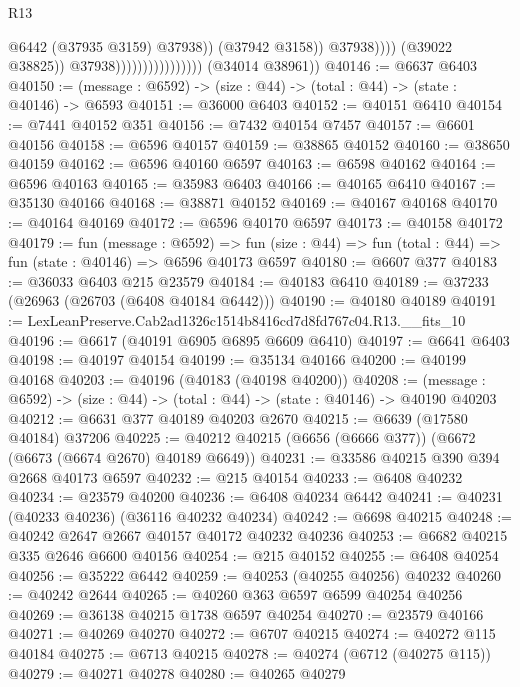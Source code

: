 \begin{lexlean}{R13}
\begin{coremodule}
                                                      @6442
                                                      (@37935 @3159)
                                                      @37938))
                                                  (@37942 @3158))
                                                @37938))))
                                        (@39022 @38825))
                                      @37938))))))))))))))))
      (@34014 @38961))
@40146 := @6637 @6403
@40150 := (message : @6592) -> (size : @44) -> (total : @44) -> (state : @40146) -> @6593
@40151 := @36000 @6403
@40152 := @40151 @6410
@40154 := @7441 @40152 @351
@40156 := @7432 @40154 @7457
@40157 := @6601 @40156
@40158 := @6596 @40157
@40159 := @38865 @40152
@40160 := @38650 @40159
@40162 := @6596 @40160 @6597
@40163 := @6598 @40162
@40164 := @6596 @40163
@40165 := @35983 @6403
@40166 := @40165 @6410
@40167 := @35130 @40166
@40168 := @38871 @40152
@40169 := @40167 @40168
@40170 := @40164 @40169
@40172 := @6596 @40170 @6597
@40173 := @40158 @40172
@40179 := fun (message : @6592) =>
  fun (size : @44) => fun (total : @44) => fun (state : @40146) => @6596 @40173 @6597
@40180 := @6607 @377
@40183 := @36033 @6403 @215 @23579
@40184 := @40183 @6410
@40189 := @37233 (@26963 (@26703 (@6408 @40184 @6442)))
@40190 := @40180 @40189
@40191 := LexLeanPreserve.Cab2ad1326c1514b8416cd7d8fd767c04.R13.__fits_10
@40196 := @6617 (@40191 @6905 @6895 @6609 @6410)
@40197 := @6641 @6403
@40198 := @40197 @40154
@40199 := @35134 @40166
@40200 := @40199 @40168
@40203 := @40196 (@40183 (@40198 @40200))
@40208 := (message : @6592) -> (size : @44) -> (total : @44) -> (state : @40146) -> @40190 @40203
@40212 := @6631 @377 @40189 @40203 @2670
@40215 := @6639 (@17580 @40184) @37206
@40225 := @40212 @40215 (@6656 (@6666 @377)) (@6672 (@6673 (@6674 @2670) @40189 @6649))
@40231 := @33586 @40215 @390 @394 @2668 @40173 @6597
@40232 := @215 @40154
@40233 := @6408 @40232
@40234 := @23579 @40200
@40236 := @6408 @40234 @6442
@40241 := @40231 (@40233 @40236) (@36116 @40232 @40234)
@40242 := @6698 @40215
@40248 := @40242 @2647 @2667 @40157 @40172 @40232 @40236
@40253 := @6682 @40215 @335 @2646 @6600 @40156
@40254 := @215 @40152
@40255 := @6408 @40254
@40256 := @35222 @6442
@40259 := @40253 (@40255 @40256) @40232
@40260 := @40242 @2644
@40265 := @40260 @363 @6597 @6599 @40254 @40256
@40269 := @36138 @40215 @1738 @6597 @40254
@40270 := @23579 @40166
@40271 := @40269 @40270
@40272 := @6707 @40215
@40274 := @40272 @115 @40184
@40275 := @6713 @40215
@40278 := @40274 (@6712 (@40275 @115))
@40279 := @40271 @40278
@40280 := @40265 @40279

\end{coremodule}
\end{lexlean}
